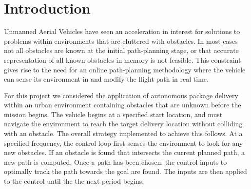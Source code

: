 \section{Introduction \label{sec:intro}}
	Unmanned Aerial Vehicles have seen an acceleration in interest for solutions to problems within environments that are cluttered with obstacles.  In most cases not all obstacles are known at the initial path-planning stage, or that accurate representation of all known obstacles in memory is not feasible.  This constraint gives rise to the need for an online path-planning methodology where the vehicle can sense its environment in and modify the flight path in real time.  

	For this project we considered the application of autonomous package delivery within an urban environment containing obstacles that are unknown before the mission begins.  The vehicle begins at a specified start location, and must navigate the environment to reach the target delivery location without colliding with an obstacle.  The overall strategy implemented to achieve this follows.  At a specified frequency, the control loop first senses the environment to look for any new obstacles.  If an obstacle is found that intersects the current planned path, a new path is computed.  Once a path has been chosen, the control inputs to optimally track the path towards the goal are found.  The inputs are then applied to the control until the the next period begins.